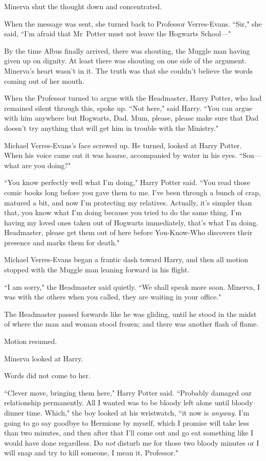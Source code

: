 Minerva shut the thought down and concentrated.

When the message was sent, she turned back to Professor Verres-Evans. ``Sir," she said, ``I'm afraid that Mr~Potter must not leave the Hogwarts School—"

By the time Albus finally arrived, there was shouting, the Muggle man having given up on dignity. At least there was shouting on one side of the argument. Minerva's heart wasn't in it. The truth was that she couldn't believe the words coming out of her mouth.

When the Professor turned to argue with the Headmaster, Harry Potter, who had remained silent through this, spoke up. ``Not here," said Harry. ``You can argue with him anywhere but Hogwarts, Dad. Mum, please, please make sure that Dad doesn't try anything that will get him in trouble with the Ministry."

Michael Verres-Evans's face screwed up. He turned, looked at Harry Potter. When his voice came out it was hoarse, accompanied by water in his eyes. ``Son—what are you doing?"

``You know perfectly well what I'm doing," Harry Potter said. ``You read those comic books long before you gave them to me. I've been through a bunch of crap, matured a bit, and now I'm protecting my relatives. Actually, it's simpler than that, you know what I'm doing because you tried to do the same thing. I'm having my loved ones taken out of Hogwarts immediately, that's what I'm doing. Headmaster, please get them out of here before You-Know-Who discovers their presence and marks them for death."

Michael Verres-Evans began a frantic dash toward Harry, and then all motion stopped with the Muggle man leaning forward in his flight.

``I am sorry," the Headmaster said quietly. ``We shall speak more soon. Minerva, I was with the others when you called, they are waiting in your office."

The Headmaster passed forwards like he was gliding, until he stood in the midst of where the man and woman stood frozen; and there was another flash of flame.

Motion resumed.

Minerva looked at Harry.

Words did not come to her.

``Clever move, bringing them here," Harry Potter said. ``Probably damaged our relationship permanently. All I wanted was to be bloody left alone until bloody dinner time. Which," the boy looked at his wristwatch, ``it now is \emph{anyway}. I'm going to go say goodbye to Hermione by myself, which I promise will take less than two minutes, and then after that I'll come out and go eat something like I would have done regardless. Do \emph{not} disturb me for those two bloody minutes or I will snap and try to kill someone, I mean it, Professor."

